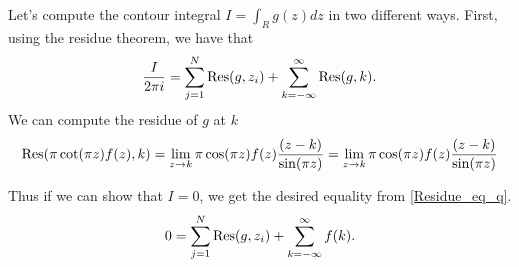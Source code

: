\documentclass{homework}
\begin{document}
                                                                                                                                                                                              \begin{solution}
                                                                                                                                                                                              Let's compute the contour integral $I=\int_R g(z)dz$ in two different ways. First, using the residue theorem, we have that 
                                                                                                                                                                                              \begin{equation}\label{Residue_eq_q}
                                                                                                                                                                                              \frac{I}{2\pi i} = \sum_{j=1}^N \operatorname{Res}(g,z_i) + \sum_{k=-\infty} ^\infty \operatorname{Res}(g, k).
                                                                                                                                                                                              \end{equation}
                                                                                                                                                                                              We can compute the residue of $g$ at $k$
                                                                                                                                                                                              \[
                                                                                                                                                                                              \operatorname{Res}(\pi\cot(\pi z)f(z), k) = \lim_{z\to k} \pi\cos(\pi z)f(z)\frac{(z-k)}{\sin(\pi z)} = \lim_{z\to k} \pi\cos(\pi z)f(z)\frac{(z-k)}{\sin(\pi z)} 
                                                                                                                                                                                              \]

                                                                                                                                                                                              Thus if we can show that $I=0$, we get the desired equality  from \eqref{Residue_eq_q}.
                                                                                                                                                                                              \[
                                                                                                                                                                                              0 = \sum_{j=1}^N \operatorname{Res}(g,z_i) + \sum_{k=-\infty} ^\infty f(k).
                                                                                                                                                                                              \]


\end{solution}
\end{document}
